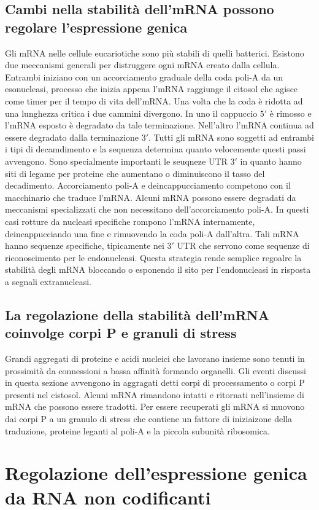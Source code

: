 \subsection{Cambi nella stabilit\`a dell'mRNA possono regolare l'espressione genica}
Gli mRNA nelle cellule eucariotiche sono pi\`u stabili di quelli batterici. Esistono due meccanismi generali per distruggere ogni mRNA creato dalla cellula. Entrambi iniziano con un
accorciamento graduale della coda poli-A da un esonucleasi, processo che inizia appena l'mRNA raggiunge il citosol che agisce come timer per il tempo di vita dell'mRNA. Una volta che 
la coda \`e ridotta ad una lunghezza critica i due cammini divergono. In uno il cappuccio $5'$ \`e rimosso e l'mRNA esposto \`e degradato da tale terminazione. Nell'altro l'mRNA continua
ad essere degradato dalla terminazione $3'$. Tutti gli mRNA sono soggetti ad entrambi i tipi di decamdimento e la sequenza determina quanto velocemente questi passi avvengono. Sono 
specialmente importanti le seuqneze UTR $3'$ in quanto hanno siti di legame per proteine che aumentano o diminuiscono il tasso del decadimento. Accorciamento poli-A e deincappucciamento
competono con il macchinario che traduce l'mRNA. Alcuni mRNA possono essere degradati da meccanismi specializzati che non necessitano dell'accorciamento poli-A. In questi casi 
rotture da nucleasi specifiche rompono l'mRNA internamente, deincappucciando una fine e rimuovendo la coda poli-A dall'altra. Tali mRNA hanno sequenze specifiche, tipicamente nei $3'$
UTR che servono come sequenze di riconoscimento per le endonucleasi. Questa strategia rende semplice regoalre la stabilit\`a degli mRNA bloccando o esponendo il sito per l'endonucleasi
in risposta a segnali extranucleasi. 
\subsection{La regolazione della stabilit\`a dell'mRNA coinvolge corpi P e granuli di stress}
Grandi aggregati di proteine e acidi nucleici che lavorano insieme sono tenuti in prossimit\`a da connessioni a bassa affinit\`a formando organelli. Gli eventi discussi in questa sezione
avvengono in aggragati detti corpi di processamento o corpi P presenti nel cistosol. Alcuni mRNA rimandono intatti e ritornati nell'insieme di mRNA che possono essere tradotti. Per
essere recuperati gli mRNA si muovono dai corpi P a un granulo di stress che contiene un fattore di iniziaizone della traduzione, proteine leganti al poli-A e la piccola subunit\`a
ribosomica.
\section{Regolazione dell'espressione genica da RNA non codificanti}
